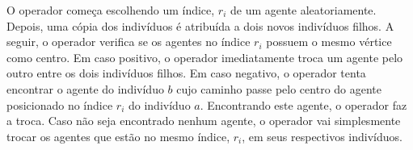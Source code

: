 O operador começa escolhendo um índice, $r_{i}$ de um agente aleatoriamente. 
Depois, uma cópia dos indivíduos é atribuída a dois novos indivíduos filhos. 
A seguir, o operador verifica se os agentes no índice $r_{i}$ possuem o mesmo 
vértice como centro. Em caso positivo, o operador imediatamente troca um agente 
pelo outro entre os dois indivíduos filhos. Em caso negativo, o operador tenta 
encontrar o agente do indivíduo $b$ cujo caminho passe pelo centro do agente 
posicionado no índice $r_{i}$ do indivíduo $a$. Encontrando este agente, o 
operador faz a troca. Caso não seja encontrado nenhum agente, o operador vai 
simplesmente trocar os agentes que estão no mesmo índice, $r_{i}$, em seus 
respectivos indivíduos.